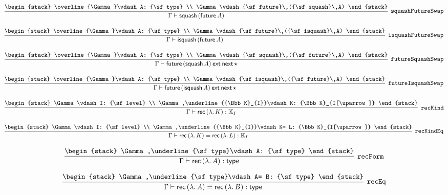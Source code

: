\[
\infer[{\tt squashFutureSwap}]{\Gamma \vdash {\sf squash}\,({\sf future}\,A)}{
\begin{stack}
\overline{\Gamma}\vdash A: {\sf type}
\\
\Gamma \vdash {\sf future}\,({\sf squash}\,A)
\end{stack}}
\]

\[
\infer[{\tt isquashFutureSwap}]{\Gamma \vdash {\sf isquash}\,({\sf future}\,A)}{
\begin{stack}
\overline{\Gamma}\vdash A: {\sf type}
\\
\Gamma \vdash {\sf future}\,({\sf isquash}\,A)
\end{stack}}
\]

\[
\infer[{\tt futureSquashSwap}]{\Gamma \vdash {\sf future}\,({\sf squash}\,A)\:{\sf ext}\:{\sf next}\,\star }{
\begin{stack}
\overline{\Gamma}\vdash A: {\sf type}
\\
\Gamma \vdash {\sf squash}\,({\sf future}\,A)
\end{stack}}
\]

\[
\infer[{\tt futureIsquashSwap}]{\Gamma \vdash {\sf future}\,({\sf isquash}\,A)\:{\sf ext}\:{\sf next}\,\star }{
\begin{stack}
\overline{\Gamma}\vdash A: {\sf type}
\\
\Gamma \vdash {\sf isquash}\,({\sf future}\,A)
\end{stack}}
\]

\[
\infer[{\tt recKind}]{\Gamma \vdash {\sf rec}\,(\lambda .\,K): {\Bbb K}_{I}}{
\begin{stack}
\Gamma \vdash I: {\sf level}
\\
\Gamma ,\underline{{\Bbb K}_{I}}\vdash K: {\Bbb K}_{I[\uparrow ]}
\end{stack}}
\]

\[
\infer[{\tt recKindEq}]{\Gamma \vdash {\sf rec}\,(\lambda .\,K)= {\sf rec}\,(\lambda .\,L): {\Bbb K}_{I}}{
\begin{stack}
\Gamma \vdash I: {\sf level}
\\
\Gamma ,\underline{{\Bbb K}_{I}}\vdash K= L: {\Bbb K}_{I[\uparrow ]}
\end{stack}}
\]

\[
\infer[{\tt recForm}]{\Gamma \vdash {\sf rec}\,(\lambda .\,A): {\sf type}}{
\begin{stack}
\Gamma ,\underline{\sf type}\vdash A: {\sf type}
\end{stack}}
\]

\[
\infer[{\tt recEq}]{\Gamma \vdash {\sf rec}\,(\lambda .\,A)= {\sf rec}\,(\lambda .\,B): {\sf type}}{
\begin{stack}
\Gamma ,\underline{\sf type}\vdash A= B: {\sf type}
\end{stack}}
\]

